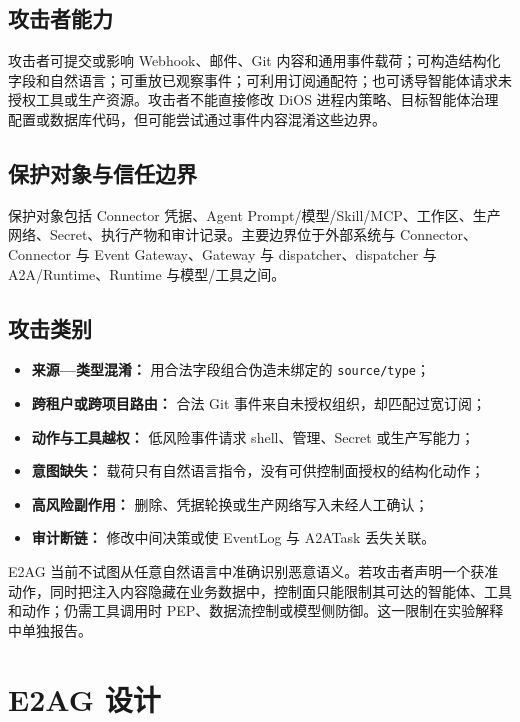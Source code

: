\subsection{攻击者能力}\label{31-ux653bux51fbux8005ux80fdux529b}

攻击者可提交或影响 Webhook、邮件、Git 内容和通用事件载荷；可构造结构化字段和自然语言；可重放已观察事件；可利用订阅通配符；也可诱导智能体请求未授权工具或生产资源。攻击者不能直接修改 DiOS 进程内策略、目标智能体治理配置或数据库代码，但可能尝试通过事件内容混淆这些边界。

\subsection{保护对象与信任边界}\label{32-ux4fddux62a4ux5bf9ux8c61ux4e0eux4fe1ux4efbux8fb9ux754c}

保护对象包括 Connector 凭据、Agent Prompt/模型/Skill/MCP、工作区、生产网络、Secret、执行产物和审计记录。主要边界位于外部系统与 Connector、Connector 与 Event Gateway、Gateway 与 dispatcher、dispatcher 与 A2A/Runtime、Runtime 与模型/工具之间。

\subsection{攻击类别}\label{33-ux653bux51fbux7c7bux522b}

\begin{itemize}
\tightlist
\item
  \textbf{来源---类型混淆：} 用合法字段组合伪造未绑定的 \texttt{source/type}；
\item
  \textbf{跨租户或跨项目路由：} 合法 Git 事件来自未授权组织，却匹配过宽订阅；
\item
  \textbf{动作与工具越权：} 低风险事件请求 shell、管理、Secret 或生产写能力；
\item
  \textbf{意图缺失：} 载荷只有自然语言指令，没有可供控制面授权的结构化动作；
\item
  \textbf{高风险副作用：} 删除、凭据轮换或生产网络写入未经人工确认；
\item
  \textbf{审计断链：} 修改中间决策或使 EventLog 与 A2ATask 丢失关联。
\end{itemize}

E2AG 当前不试图从任意自然语言中准确识别恶意语义。若攻击者声明一个获准动作，同时把注入内容隐藏在业务数据中，控制面只能限制其可达的智能体、工具和动作；仍需工具调用时 PEP、数据流控制或模型侧防御。这一限制在实验解释中单独报告。

\section{E2AG 设计}\label{sec:design}

